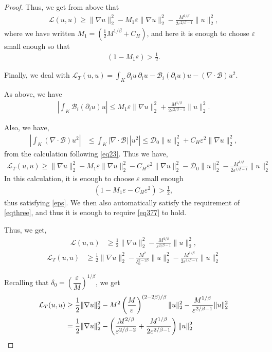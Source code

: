 \documentclass{article}
\theoremstyle{plain}
\theoremstyle{definition}
\theoremstyle{plain}
\begin{document}
\begin{proof}
Thus, we get from above that
\begin{align}
\mathcal{L}(u,u) \geq \|\nabla u\|_2^2 - M_1\varepsilon\|\nabla u\|_2^2
- \frac{M^{1/\beta}}{2\varepsilon^{2/\beta -1}}\|u\|_2^2,
\end{align}
where we have written $M_1 = (\frac{1}{2}M^{1/\beta} + C_H)$, and here it is enough to choose $\varepsilon$
small enough so that
\begin{align}\label{eqthree}
(1 - M_1\varepsilon) > \frac{1}{2}.
\end{align}

Finally, we deal with $\mathcal{L}_T(u,u) = \int_K \partial_i u\, \partial_i u
- \mathcal{B}_i(\partial_i u)u - (\nabla\cdot\mathcal{B})u^2$.

As above, we have
\begin{align}
\left|\int_K \mathcal{B}_i(\partial_i u)u\right|
\leq M_1\varepsilon\|\nabla u\|_2^2 + \frac{M^{1/\beta}}{2\varepsilon^{2/\beta -1}}\|u\|_2^2.
\end{align}

Also, we have,
\begin{align}
\left|\int_K (\nabla\cdot\mathcal{B})u^2\right|
&\leq \int_K |\nabla\cdot\mathcal{B}|\,|u^2|
\leq \mathcal{D}_0\|u\|_2^2 + C_H \varepsilon^2\|\nabla u\|_2^2,
\end{align}
from the calculation following \cref{eq23}. Thus we have,
\begin{align}
\mathcal{L}_T(u,u) \geq \|\nabla u\|_2^2 - M_1\varepsilon\|\nabla u\|_2^2
- C_H \varepsilon^2\|\nabla u\|_2^2 - \mathcal{D}_0\|u\|_2^2
- \frac{M^{1/\beta}}{2\varepsilon^{1/\beta -1}}\|u\|_2^2
\end{align}
In this calculation, it is enough to choose $\varepsilon$ small enough 
\begin{align}\label{eq377}
(1 - M_1\varepsilon - C_H \varepsilon^2) > \frac{1}{2},
\end{align} 
thus satisfying \cref{eps}. We then also automatically satisfy the requirement of \cref{eqthree}, and thus it is enough to require \cref{eq377} to hold.


Thus, we get,
\begin{align}
\mathcal{L}(u,u) &\geq \frac{1}{2}\|\nabla u\|_2^2 - \frac{M^{1/\beta}}{\varepsilon^{2/\beta -1}}\|u\|_2^2,
\end{align}
\begin{align}
\mathcal{L}_T(u,u) &\geq \frac{1}{2}\|\nabla u\|_2^2 - \frac{M^2}{\delta_0^{2-2\beta}}\|u\|_2^2 - \frac{M^{1/\beta}}{2\varepsilon^{1/\beta -1}}\|u\|_2^2
\end{align}

Recalling that $\delta_0 = \left(\dfrac{\varepsilon}{M}\right)^{1/\beta}$, we get
\begin{align}
\mathcal{L}_T(u,u) &\geq \frac{1}{2}\|\nabla u\|_2^2
- M^2 \left(\frac{M}{\varepsilon}\right)^{(2-2\beta)/\beta} \|u\|_2^2
- \frac{M^{1/\beta}}{\varepsilon^{2/\beta-1}}\|u\|_2^2 \notag \\
&= \frac{1}{2}\|\nabla u\|_2^2
- \left(\frac{M^{2/\beta}}{\varepsilon^{2/\beta-2}} + \frac{M^{1/\beta}}{2\varepsilon^{2/\beta-1}}\right)\|u\|_2^2
\end{align}


\end{proof}
\end{document}
